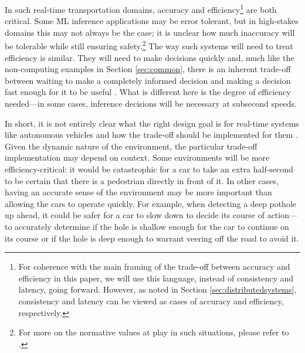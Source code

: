 \documentclass[sigplan,screen]{acmart}
\begin{document}
In such real-time transportation domains, accuracy and efficiency\footnote{For coherence with the main framing of the trade-off between accuracy and efficiency in this paper, we will use this language, instead of consistency and latency, going forward. However, as noted in Section \ref{sec:distributedsystems}, consistency and latency can be viewed as cases of accuracy and efficiency, respectively.} are both critical. Some ML inference applications may be error tolerant, but in high-stakes domains this may not always be the case; it is unclear how much inaccuracy will be tolerable while still ensuring safety.\footnote{For more on the normative values at play in such situations, please refer to \citet{cooper2020law}.} The way such systems will need to treat efficiency is similar. They will need to make decisions quickly and, much like the non-computing examples in Section \ref{sec:common}, there is an inherent trade-off between waiting to make a completely informed decision and making a decision fast enough for it to be useful \cite{Abadi2012tradeoff, Brewer12computer}. What is different here is the degree of efficiency needed---in some cases, inference decisions will be necessary at subsecond speeds.

In short, it is not entirely clear what the right design goal is for real-time systems like autonomous vehicles and how the trade-off should be implemented for them \cite{Dietterich2018robustAI}. Given the dynamic nature of the environment, the particular trade-off implementation may depend on context. Some environments will be more efficiency-critical: it would be catastrophic for a car to take an extra half-second to be certain that there is a pedestrian directly in front of it. In other cases, having an accurate sense of the environment may be more important than allowing the cars to operate quickly. For example, when detecting a deep pothole up ahead, it could be safer for a car to slow down to decide its course of action---to accurately determine if the hole is shallow enough for the car to continue on its course or if the hole is deep enough to warrant veering off the road to avoid it.
\end{document}

